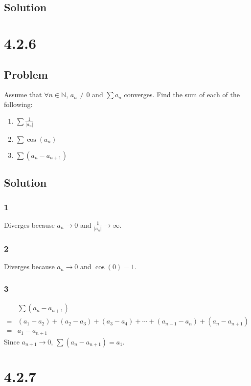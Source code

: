 \documentclass[12pt]{article}
\newcommand{\abs}  [1]{\left|       #1 \right|      }
\newcommand{\N}    [0]{\mathbb{N}                   }
\begin{document}
\subsection*{Solution}



\section*{4.2.6}

\subsection*{Problem}
Assume that $\forall n \in \N$, $a_n \neq 0$ and $\sum a_n$ converges. Find the sum of each of the following:
\begin{enumerate}
    \item $\sum \frac{1}{\abs{a_n}}$
    \item $\sum \cos(a_n)$
    \item $\sum (a_n - a_{n+1})$
\end{enumerate}

\subsection*{Solution}

\subsubsection*{1}
Diverges because $a_n \to 0$ and $\frac{1}{\abs{a_n}} \to \infty$.

\subsubsection*{2}
Diverges because $a_n \to 0$ and $\cos(0) = 1$.

\subsubsection*{3}
\begin{align*}
     & \sum (a_n - a_{n+1}) \\
    =& (a_1 - a_2) + (a_2 - a_3) + (a_3 - a_4) + \cdots + (a_{n-1} - a_n) + (a_n - a_{n+1}) \\
    =& a_1 - a_{n+1}
\end{align*}
Since $a_{n+1} \to 0$, $\sum (a_n - a_{n+1}) = a_1$.



\section*{4.2.7}
\end{document}
